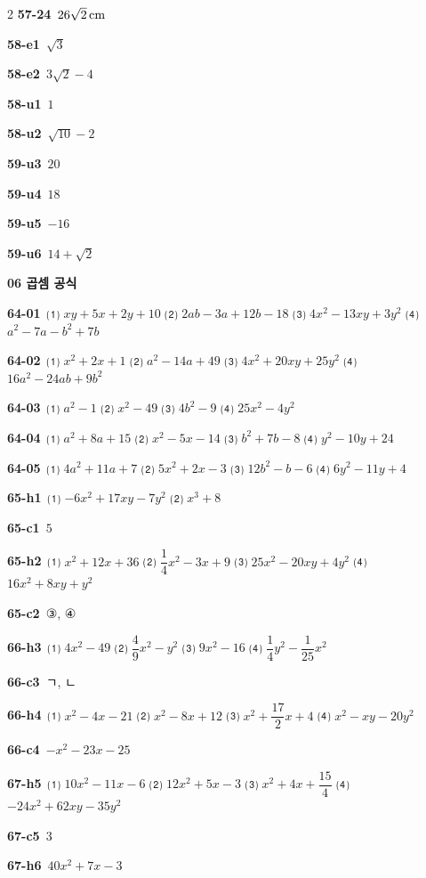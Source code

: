 \documentclass[10pt,a4paper]{article}
\begin{document}
\begin{multicols}{2}
\noindent\textbf{57-24}\ $26\sqrt{2}\mkern3mu \mathrm{cm}$\par
\noindent\textbf{58-e1}\ $\sqrt{3}$\par
\noindent\textbf{58-e2}\ $3\sqrt{2}-4$\par
\noindent\textbf{58-u1}\ $1$\par
\noindent\textbf{58-u2}\ $\sqrt{10}-2$\par
\noindent\textbf{59-u3}\ $20$\par
\noindent\textbf{59-u4}\ $18$\par
\noindent\textbf{59-u5}\ $-16$\par
\noindent\textbf{59-u6}\ $14+\sqrt{2}$\par
\noindent\textbf{06 곱셈 공식}\par\smallskip
\noindent\textbf{64-01}\ ⑴ $xy+5x+2y+10$ ⑵ $2ab-3a+12b-18$ ⑶ $4x^2-13xy+3y^2$ ⑷ $a^2-7a-b^2+7b$\par
\noindent\textbf{64-02}\ ⑴ $x^2+2x+1$ ⑵ $a^2-14a+49$ ⑶ $4x^2+20xy+25y^2$ ⑷ $16a^2-24ab+9b^2$\par
\noindent\textbf{64-03}\ ⑴ $a^2-1$ ⑵ $x^2-49$ ⑶ $4b^2-9$ ⑷ $25x^2-4y^2$\par
\noindent\textbf{64-04}\ ⑴ $a^2+8a+15$ ⑵ $x^2-5x-14$ ⑶ $b^2+7b-8$ ⑷ $y^2-10y+24$\par
\noindent\textbf{64-05}\ ⑴ $4a^2+11a+7$ ⑵ $5x^2+2x-3$ ⑶ $12b^2-b-6$ ⑷ $6y^2-11y+4$\par
\noindent\textbf{65-h1}\ ⑴ $-6x^2+17xy-7y^2$ ⑵ $x^3+8$\par
\noindent\textbf{65-c1}\ $5$\par
\noindent\textbf{65-h2}\ ⑴ $x^2+12x+36$ ⑵ $\dfrac{1}{4}x^2-3x+9$ ⑶ $25x^2-20xy+4y^2$ ⑷ $16x^2+8xy+y^2$\par
\noindent\textbf{65-c2}\ ③, ④\par
\noindent\textbf{66-h3}\ ⑴ $4x^2-49$ ⑵ $\dfrac{4}{9}x^2-y^2$ ⑶ $9x^2-16$ ⑷ $\dfrac{1}{4}y^2-\dfrac{1}{25}x^2$\par
\noindent\textbf{66-c3}\ ㄱ, ㄴ\par
\noindent\textbf{66-h4}\ ⑴ $x^2-4x-21$ ⑵ $x^2-8x+12$ ⑶ $x^2+\dfrac{17}{2}x+4$ ⑷ $x^2-xy-20y^2$\par
\noindent\textbf{66-c4}\ $-x^2-23x-25$\par
\noindent\textbf{67-h5}\ ⑴ $10x^2-11x-6$ ⑵ $12x^2+5x-3$ ⑶ $x^2+4x+\dfrac{15}{4}$ ⑷ $-24x^2+62xy-35y^2$\par
\noindent\textbf{67-c5}\ $3$\par
\noindent\textbf{67-h6}\ $40x^2+7x-3$\par

\end{multicols}
\end{document}
